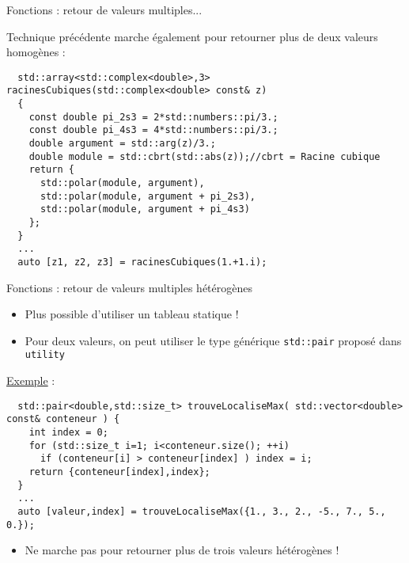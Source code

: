 \documentclass[compress,10pt,aspectratio=169]{beamer}
\begin{document}
  \begin{frame}[fragile]{Fonctions : retour de valeurs multiples...}
    \scriptsize
  
  Technique précédente marche également pour retourner plus de deux valeurs homogènes :
  \begin{verbatim}
  std::array<std::complex<double>,3> racinesCubiques(std::complex<double> const& z)
  {
    const double pi_2s3 = 2*std::numbers::pi/3.;
    const double pi_4s3 = 4*std::numbers::pi/3.;
    double argument = std::arg(z)/3.;
    double module = std::cbrt(std::abs(z));//cbrt = Racine cubique
    return {
      std::polar(module, argument),
      std::polar(module, argument + pi_2s3),
      std::polar(module, argument + pi_4s3)
    };
  }
  ... 
  auto [z1, z2, z3] = racinesCubiques(1.+1.i);
  \end{verbatim}
  \end{frame}
  
  \begin{frame}[fragile]{Fonctions : retour de valeurs multiples hétérogènes}
  \scriptsize
  
  \begin{itemize}
  \item Plus possible d'utiliser un tableau statique !
  \item Pour deux valeurs, on peut utiliser le type générique \texttt{std::pair} proposé dans \texttt{utility}
  \end{itemize}
  
  \underline{\textcolor{NavyBlue}{Exemple}} :
  \begin{verbatim}
  std::pair<double,std::size_t> trouveLocaliseMax( std::vector<double> const& conteneur ) {
    int index = 0;
    for (std::size_t i=1; i<conteneur.size(); ++i)
      if (conteneur[i] > conteneur[index] ) index = i;
    return {conteneur[index],index};
  }
  ... 
  auto [valeur,index] = trouveLocaliseMax({1., 3., 2., -5., 7., 5., 0.});
  \end{verbatim}
  
  \begin{itemize}
    \item Ne marche pas pour retourner plus de trois valeurs hétérogènes !
  \end{itemize}
  \end{frame}
  
\end{document}
